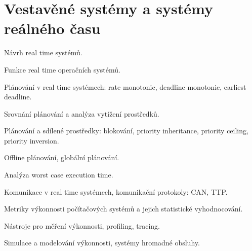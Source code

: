 \newpage
\section{Vestavěné systémy a systémy reálného času}
\begin{pozadavky}
\begin{pitemize}
\item Návrh real time systémů.
\item Funkce real time operačních systémů.
\item Plánování v real time systémech: rate monotonic, deadline monotonic, earliest deadline.
\item Srovnání plánování a analýza vytížení prostředků.
\item Plánování a sdílené prostředky: blokování, priority inheritance, priority ceiling, priority inversion.
\item Offline plánování, globální plánování.
\item Analýza worst case execution time.
\item Komunikace v real time systémech, komunikační protokoly: CAN, TTP.
\item Metriky výkonnosti počítačových systémů a jejich statistické vyhodnocování.
\item Nástroje pro měření výkonnosti, profiling, tracing.
\item Simulace a modelování výkonnosti, systémy hromadné obsluhy.
\end{pitemize}
\end{pozadavky}